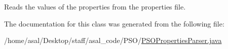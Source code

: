Reads the values of the properties from the properties file. 

The documentation for this class was generated from the following file\+:\begin{DoxyCompactItemize}
\item 
/home/asal/\+Desktop/staff/asal\+\_\+code/\+P\+S\+O/\hyperlink{_p_s_o_properties_parser_8java}{P\+S\+O\+Properties\+Parser.\+java}\end{DoxyCompactItemize}

